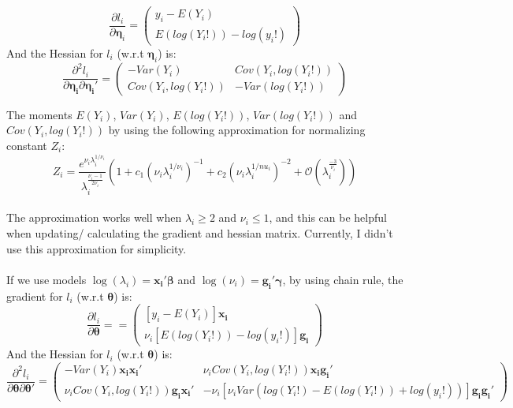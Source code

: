 \documentclass[]{article}
\begin{document}
\begin{equation*}
	\frac{\partial l_i}{\partial \boldsymbol{\eta}_i} = 
	\begin{pmatrix} y_i - E(Y_i)\\
		E(log(Y_i!)) - log(y_i!)
	\end{pmatrix}
\end{equation*}
And the Hessian for $l_i$ (w.r.t $\boldsymbol{\eta}_i$) is:
\begin{equation*}
	\frac{\partial^2 l_i}{\partial \boldsymbol{\eta_i}\partial \boldsymbol{\eta_i}'}= 
	\begin{pmatrix} -Var(Y_i) & Cov(Y_i, log(Y_i!))\\
		Cov(Y_i, log(Y_i!)) & -Var(log(Y_i!))
	\end{pmatrix}
\end{equation*}

The moments $E(Y_i)$, $Var(Y_i)$, $E(log(Y_i!))$, $Var(log(Y_i!))$ and $Cov(Y_i, log(Y_i!))$ by using the following approximation for normalizing constant $Z_i$:
\begin{equation*}
	Z_i = \frac{e^{\nu_i \lambda_i^{1/\nu_i}}}{\lambda_i^{\frac{\nu_i-1}{2\nu_i}}}\left(1 + c_1(\nu_i \lambda_i^{1/\nu_i})^{-1} + c_2(\nu_i \lambda_i^{1/nu_i})^{-2} + \mathcal{O}(\lambda_i^{\frac{-3}{\nu_i}})\right)
\end{equation*}
\\
The approximation works well when $\lambda_i \geq 2$ and $\nu_i \leq 1$, and this can be helpful when updating/ calculating the gradient and hessian matrix. Currently, I didn't use this approximation for simplicity.\\
\\
If we use models $\log(\lambda_i) = \boldsymbol{x_i}'\boldsymbol{\beta}$ and $\log(\nu_i) = \boldsymbol{g_i}'\boldsymbol{\gamma}$, by using chain rule, the gradient for $l_i$ (w.r.t $\boldsymbol{\theta}$) is:
\begin{equation*}
	\frac{\partial l_i}{\partial \boldsymbol{\theta}} = 
	 = \begin{pmatrix} [y_i - E(Y_i)]\boldsymbol{x_i}\\
		\nu_i[E(log(Y_i!)) - log(y_i!)]\boldsymbol{g_i}
	\end{pmatrix}
\end{equation*}
And the Hessian for $l_i$ (w.r.t $\boldsymbol{\theta}$) is:
\begin{equation*}
	\frac{\partial^2 l_i}{\partial \boldsymbol{\theta}\partial \boldsymbol{\theta}'} = 
	\begin{pmatrix} -Var(Y_i)\boldsymbol{x_i}\boldsymbol{x_i}' &
		 \nu_i Cov(Y_i, log(Y_i!))\boldsymbol{x_i}\boldsymbol{g_i}'\\
		\nu_i Cov(Y_i, log(Y_i!))\boldsymbol{g_i}\boldsymbol{x_i}' &
		 -\nu_i[\nu_i Var(log(Y_i!) - E(log(Y_i!)) + log(y_i!))]\boldsymbol{g_i}\boldsymbol{g_i}'
	\end{pmatrix}
\end{equation*}
\end{document}
